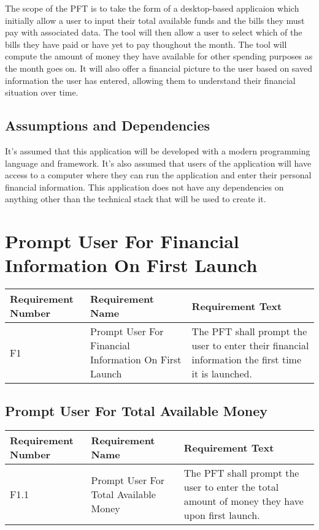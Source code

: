 \documentclass{article}
\begin{document}
The scope of the PFT is to take the form of a desktop-based applicaion which initially allow a user to input their total available funds and the bills they must pay with associated data. The tool will then allow a user to select which of the bills they have paid or have yet to pay thoughout the month.
The tool will compute the amount of money they have available for other spending purposes as the month goes on. It will also offer a financial picture to the user based on saved information the user has entered, allowing them to understand
their financial situation over time.

\subsection{Assumptions and Dependencies}

It's assumed that this application will be developed with a modern programming language and framework. It's also assumed that users of the application
will have access to a computer where they can run the application and enter their personal financial information. This application does not have any dependencies on anything other than the technical stack that will be used to create it.

\section{Prompt User For Financial Information On First Launch}

\begin{longtable}{|p{2cm}|p{6cm}| p{6cm}|}
    \hline
    \textbf{Requirement Number} & \textbf{Requirement Name} & \textbf{Requirement Text}\\
    \hline
    F1 & Prompt User For Financial Information On First Launch & The PFT shall prompt the user to enter their financial information the first time it is launched. \\
    \hline
\end{longtable}

\subsection{Prompt User For Total Available Money}

\begin{longtable}{|p{2cm}|p{6cm}| p{6cm}|}
    \hline
    \textbf{Requirement Number} & \textbf{Requirement Name} & \textbf{Requirement Text}\\
    \hline
    F1.1 & Prompt User For Total Available Money & The PFT shall prompt the user to enter the total amount of money they have upon first launch. \\
    \hline
\end{longtable}
\end{document}
